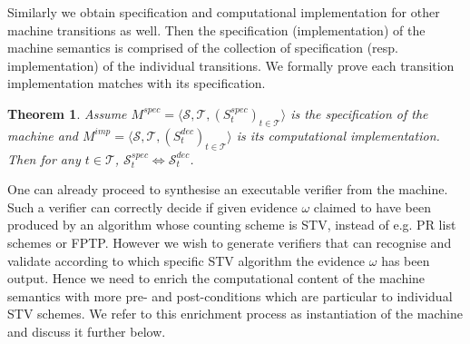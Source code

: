 \documentclass[10pt,conference]{IEEEtran}
\newtheorem{theorem}{Theorem}
\begin{document}
Similarly 
we obtain specification and computational implementation for other machine transitions as well. Then the specification (implementation) of the machine semantics is comprised of the collection of specification (resp. implementation) of the individual transitions. We formally prove 
each transition implementation  matches with its specification.

\begin{theorem}
Assume $M^{spec} = \langle \mathcal{S}, \mathcal{T}, (S_{t}^{spec})_{t \in \mathcal{T}} \rangle$ is the specification of the machine and  $M^{imp} = \langle \mathcal{S}, \mathcal{T}, (S_{t}^{dec})_{t \in \mathcal{T}} \rangle$ is its computational implementation. Then for any $t\in\mathcal{T}$,  $\mathcal{S}_{t}^{spec}\Leftrightarrow\mathcal{S}_{t}^{dec}$.      
\end{theorem}




One can already proceed to synthesise an executable verifier from the machine. Such a verifier can correctly decide if given evidence $\omega$ claimed to have been produced by an algorithm whose counting scheme is STV, instead of e.g. PR list schemes or FPTP. 
However we wish to generate verifiers that can recognise and validate according to which specific STV algorithm the evidence $\omega$ has been output. Hence we need to enrich the computational content of the machine semantics with more  pre- and post-conditions which are particular to individual STV schemes. We refer to this enrichment process as instantiation of the machine and discuss it further below.
\end{document}

